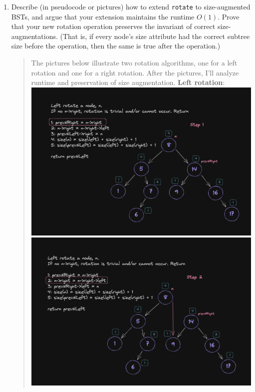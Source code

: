\documentclass[11pt]{article}
\begin{document}
\begin{enumerate}
\begin{enumerate}
        \item Describe (in pseudocode or pictures) how to extend \texttt{rotate} to size-augmented BSTs, and argue that your extension maintains the runtime $O(1)$. Prove that your new rotation operation preserves the invariant of correct size-augmentations. (That is, if every node's size attribute had the correct subtree size before the operation, then the same is true after the operation.)
        \begin{quote}
            \color{purple}
            The pictures below illustrate two rotation algorithms, one for a left rotation and one for a right rotation. After the pictures, I'll analyze runtime and preservation of size augmentation. \newline
            \newline
            \textbf{Left rotation}: \newline \newline
           \includegraphics[scale=0.3]{left_rotations/lr1.png}         
           \newline
           \includegraphics[scale=0.3]{left_rotations/lr2.png}         

\end{quote}
\end{enumerate}
\end{enumerate}
\end{document}
